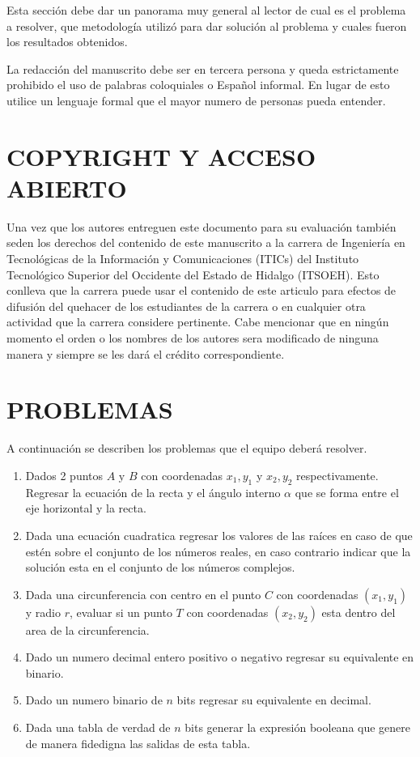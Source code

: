 \documentclass{IEEEcsmag}
\begin{document}
Esta sección debe dar un panorama muy general al lector de cual es el problema a resolver, que metodología utilizó para dar solución al problema y cuales fueron los resultados obtenidos. 

La redacción del manuscrito debe ser en tercera persona y queda estrictamente prohibido el uso de palabras coloquiales o Español informal. En lugar de esto utilice un lenguaje formal que el mayor numero de personas pueda entender.

\section{COPYRIGHT Y ACCESO ABIERTO}

Una vez que los autores entreguen este documento para su evaluación también seden los derechos del contenido de este manuscrito a la carrera de Ingeniería en Tecnológicas de la Información y Comunicaciones (ITICs) del Instituto Tecnológico Superior del Occidente del Estado de Hidalgo (ITSOEH). Esto conlleva que la carrera puede usar el contenido de este articulo para efectos de difusión del quehacer de los estudiantes de la carrera o en cualquier otra actividad que la carrera considere pertinente. Cabe mencionar que en ningún momento el orden o los nombres de los autores sera modificado de ninguna manera y siempre se les dará el crédito correspondiente. 
\section{PROBLEMAS}
A continuación se describen los problemas que el equipo deberá resolver.
\begin{enumerate}
\item Dados 2 puntos $A \mbox{ y } B$ con coordenadas $x_{1}, y_{1}$ y $x_{2}, y_{2}$  respectivamente. Regresar la ecuación de la recta y el ángulo interno $\alpha$ que se forma entre el eje horizontal y la recta. 
\item Dada una ecuación cuadratica regresar los valores de las raíces en caso de que estén sobre el conjunto de los números reales, en caso contrario indicar que la solución esta en el conjunto de los números complejos. 
\item Dada una circunferencia con centro en el punto $C$ con coordenadas $(x_{1}, y_{1})$ y radio $r$, evaluar si un punto $T$ con coordenadas $(x_{2}, y_{2})$ esta dentro del area de la circunferencia.
\item Dado un numero decimal entero positivo o negativo regresar su equivalente en binario.
\item Dado un numero binario de $n$ bits regresar su equivalente en decimal.
\item Dada una tabla de verdad de $n$ bits generar la expresión booleana que genere de manera fidedigna las salidas de esta tabla.
\end{enumerate}
\end{document}
